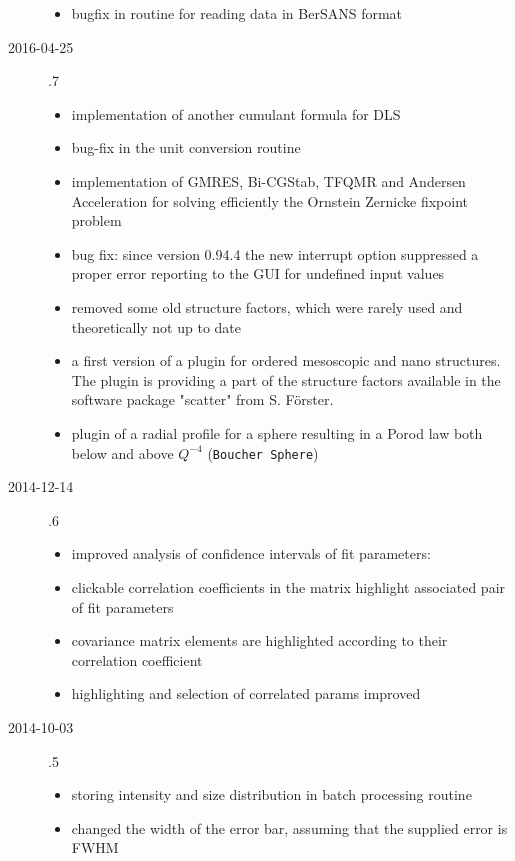 \begin{description}
\begin{itemize}
        \item bugfix in routine for reading data in BerSANS format
    \end{itemize}
\item[2016-04-25] .7
    \begin{itemize}
        \item  implementation of another cumulant formula for DLS
        \item  bug-fix in the unit conversion routine
        \item  implementation of GMRES, Bi-CGStab, TFQMR and Andersen Acceleration
                for solving efficiently the Ornstein Zernicke fixpoint problem
        \item   bug fix: since version 0.94.4 the new interrupt option suppressed
                a proper error reporting to the GUI for undefined input values
        \item   removed some old structure factors,
                which were rarely used and theoretically not up to date
        \item   a first version of a plugin for ordered mesoscopic and nano structures.
                The plugin is providing a part of the structure factors available
                in the software package "scatter" from S. Förster.
        \item   plugin of a radial profile for a sphere resulting in a Porod law both below and above $Q^{-4}$ (\texttt{Boucher Sphere})
    \end{itemize}
\item[2014-12-14] .6
    \begin{itemize}
        \item improved analysis of confidence intervals of fit parameters:
        \item clickable correlation coefficients in the matrix highlight associated
             pair of fit parameters
        \item covariance matrix elements are highlighted according to their correlation
            coefficient
        \item highlighting and selection of correlated params improved
    \end{itemize}
\item[2014-10-03] .5
    \begin{itemize}
        \item storing intensity and size distribution in batch processing routine
        \item changed the width of the error bar, assuming that the supplied error is FWHM

\end{itemize}
\end{description}
